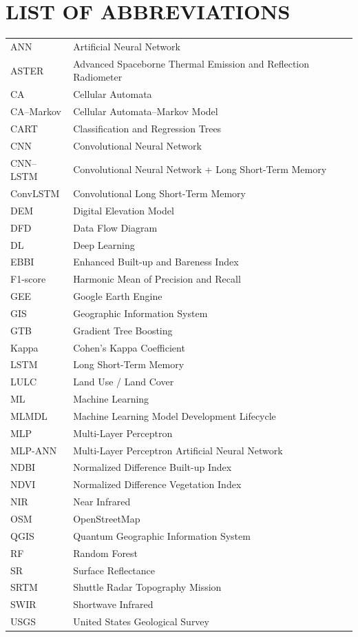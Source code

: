 \documentclass[main]{subfiles}
\begin{document}
\section*{\centering \Large{\MakeUppercase{List of Abbreviations}}}

\begin{tabular}{p{3.5cm} p{11cm}}
ANN        & Artificial Neural Network \\
ASTER     & Advanced Spaceborne Thermal Emission and Reflection Radiometer \\
CA         & Cellular Automata \\
CA--Markov& Cellular Automata--Markov Model \\
CART       & Classification and Regression Trees \\
CNN        & Convolutional Neural Network \\
CNN--LSTM & Convolutional Neural Network + Long Short-Term Memory \\
ConvLSTM  & Convolutional Long Short-Term Memory \\
DEM        & Digital Elevation Model \\
DFD        & Data Flow Diagram \\
DL         & Deep Learning \\
EBBI       & Enhanced Built-up and Bareness Index \\
F1-score   & Harmonic Mean of Precision and Recall \\
GEE        & Google Earth Engine \\
GIS        & Geographic Information System \\
GTB        & Gradient Tree Boosting \\
Kappa      & Cohen's Kappa Coefficient \\
LSTM       & Long Short-Term Memory \\
LULC       & Land Use / Land Cover \\
ML         & Machine Learning \\
MLMDL     & Machine Learning Model Development Lifecycle \\
MLP        & Multi-Layer Perceptron \\
MLP-ANN    & Multi-Layer Perceptron Artificial Neural Network \\
NDBI       & Normalized Difference Built-up Index \\
NDVI       & Normalized Difference Vegetation Index \\
NIR        & Near Infrared \\
OSM        & OpenStreetMap \\
QGIS       & Quantum Geographic Information System \\
RF         & Random Forest \\
SR         & Surface Reflectance \\
SRTM       & Shuttle Radar Topography Mission \\
SWIR       & Shortwave Infrared \\
USGS       & United States Geological Survey \\
\end{tabular}
\end{document}
